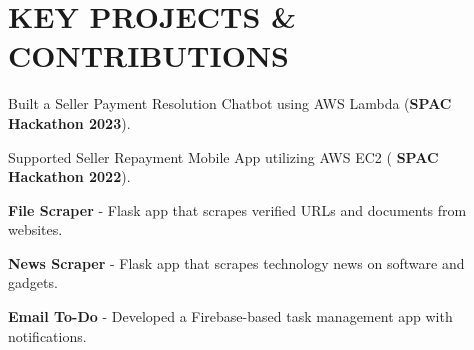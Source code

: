 \section{KEY PROJECTS \& CONTRIBUTIONS}
\begin{onecolentry}
    \begin{highlights}
        \item Built a Seller Payment Resolution Chatbot using AWS Lambda (\textbf{SPAC Hackathon 2023}).
        \item Supported Seller Repayment Mobile App utilizing AWS EC2 (
        \textbf{SPAC Hackathon 2022}).
        \item \textbf{File Scraper} - Flask app that scrapes verified URLs and documents from websites. {}
        \item \textbf{News Scraper} - Flask app that scrapes technology news on software and gadgets. {}
        \item \textbf{Email To-Do} - Developed a Firebase-based task management app with notifications.
        {}
    \end{highlights}
\end{onecolentry}